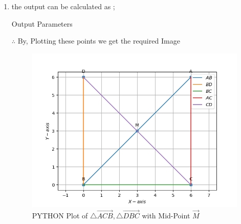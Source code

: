 \documentclass[10pt]{article}
\begin{document}
\begin{enumerate}
\begin{enumerate}
\item the output can be calculated as ;
\begin{table}[H]
\centering
	
	  \caption{Output Parameters}
	  \label{Table-2:Output_params}
\end{table}

		$\therefore$ By, Plotting these points we get the required Image 

\begin{figure}[H]
	\includegraphics[width = \columnwidth]{figs/python_plot.png}
    \caption{PYTHON Plot of $\triangle \vec{ACB} ,\triangle \vec{DBC}$ with Mid-Point $\vec{M}$}
    \label{fig:fig-2}
\end{figure}
\end{enumerate}
\end{enumerate}
\end{document}
